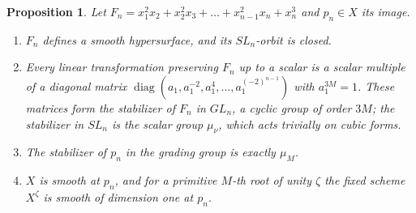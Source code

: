 \documentclass[11pt,a4paper]{article}
\newtheorem{proposition}[theorem]{Proposition}
\theoremstyle{definition}
\newcommand{\diag}{\operatorname{diag}}
\begin{document}
\begin{proposition}\label{prop:chaincubic}
Let $F_n=x_1^2x_2+x_2^2x_3+\dots+x_{n-1}^2x_n+x_n^3$ and $p_n\in X$ its image.
\begin{enumerate}
\item $F_n$ defines a smooth hypersurface, and its $SL_n$-orbit is closed.
\item Every linear transformation preserving $F_n$ up to a scalar is a scalar
multiple of a diagonal matrix $\diag(a_1,a_1^{-2},a_1^4,\dots,a_1^{(-2)^{n-1}})$
with $a_1^{3M}=1$. These matrices form the stabilizer of $F_n$ in $GL_n$, a
cyclic group of order $3M$; the stabilizer in $SL_n$ is the scalar group
$\mu_\nu$, which acts trivially on cubic forms.
\item The stabilizer of $p_n$ in the grading group is exactly $\mu_M$.
\item $X$ is smooth at $p_n$, and for a primitive $M$-th root of unity $\zeta$
the fixed scheme $X^\zeta$ is smooth of dimension one at $p_n$.
\end{enumerate}
\end{proposition}
\end{document}
